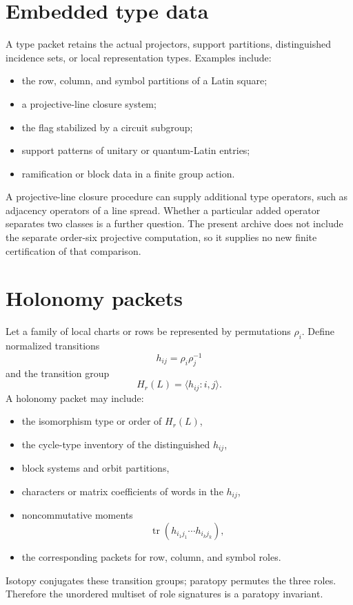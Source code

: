 \section{Embedded type data}
A type packet retains the actual projectors, support partitions, distinguished incidence sets, or local representation types.  Examples include:
\begin{itemize}
\item the row, column, and symbol partitions of a Latin square;
\item a projective-line closure system;
\item the flag stabilized by a circuit subgroup;
\item support patterns of unitary or quantum-Latin entries;
\item ramification or block data in a finite group action.
\end{itemize}

A projective-line closure procedure can supply additional type operators, such as adjacency operators of a line spread.  Whether a particular added operator separates two classes is a further question.  The present archive does not include the separate order-six projective computation, so it supplies no new finite certification of that comparison.

\section{Holonomy packets}
Let a family of local charts or rows be represented by permutations $\rho_i$.  Define normalized transitions
\[
h_{ij}=\rho_i\rho_j^{-1}
\]
and the transition group
\[
H_r(L)=\langle h_{ij}:i,j\rangle.
\]
A holonomy packet may include:
\begin{itemize}
\item the isomorphism type or order of $H_r(L)$,
\item the cycle-type inventory of the distinguished $h_{ij}$,
\item block systems and orbit partitions,
\item characters or matrix coefficients of words in the $h_{ij}$,
\item noncommutative moments
\[
\operatorname{tr}(h_{i_1j_1}\cdots h_{i_kj_k}),
\]
\item the corresponding packets for row, column, and symbol roles.
\end{itemize}

Isotopy conjugates these transition groups; paratopy permutes the three roles.  Therefore the unordered multiset of role signatures is a paratopy invariant.


